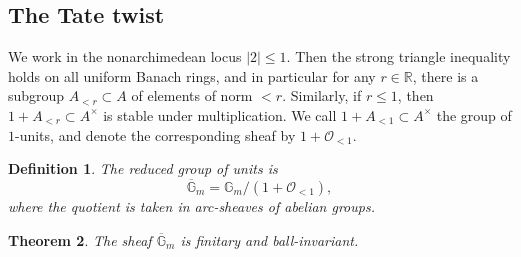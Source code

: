 \documentclass[11pt]{amsart}
\numberwithin{equation}{section}
\newtheorem{theorem}{Theorem}
\numberwithin{theorem}{section}
\newtheorem{definition}[theorem]{Definition}
\theoremstyle{definition}
\begin{document}
\subsection{The Tate twist}

We work in the nonarchimedean locus $|2|\leq 1$. Then the strong triangle inequality holds on all uniform Banach rings, and in particular for any $r\in \mathbb R$, there is a subgroup $A_{<r}\subset A$ of elements of norm $<r$. Similarly, if $r\leq 1$, then $1+A_{<r}\subset A^\times$ is stable under multiplication. We call $1+A_{<1}\subset A^\times$ the group of $1$-units, and denote the corresponding sheaf by $1+\mathcal O_{<1}$.

\begin{definition} The reduced group of units is
\[
\overline{\mathbb G}_m = \mathbb G_m / (1 + \mathcal O_{<1}),
\]
where the quotient is taken in arc-sheaves of abelian groups.
\end{definition}

\begin{theorem}\label{thm:reducedunitsballinvariant} The sheaf $\overline{\mathbb G}_m$ is finitary and ball-invariant.
\end{theorem}
\end{document}
